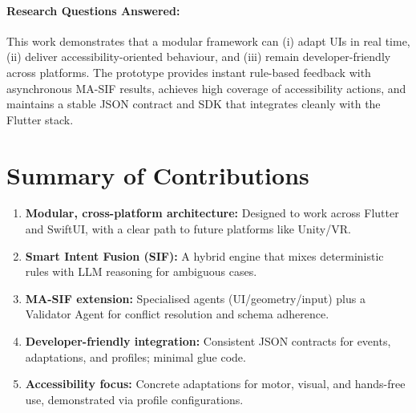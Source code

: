 \documentclass[openany]{book}
\begin{document}
\paragraph{Research Questions Answered:}
This work demonstrates that a modular framework can (i) adapt UIs in real time, (ii) deliver accessibility-oriented behaviour, and (iii) remain developer-friendly across platforms. The prototype provides instant rule-based feedback with asynchronous MA-SIF results, achieves high coverage of accessibility actions, and maintains a stable JSON contract and SDK that integrates cleanly with the Flutter stack.

\section{Summary of Contributions}
\begin{enumerate}
    \item \textbf{Modular, cross-platform architecture:} Designed to work across Flutter and SwiftUI, with a clear path to future platforms like Unity/VR.
    \item \textbf{Smart Intent Fusion (SIF):} A hybrid engine that mixes deterministic rules with LLM reasoning for ambiguous cases.
    \item \textbf{MA-SIF extension:} Specialised agents (UI/geometry/input) plus a Validator Agent for conflict resolution and schema adherence.
    \item \textbf{Developer-friendly integration:} Consistent JSON contracts for events, adaptations, and profiles; minimal glue code.
    \item \textbf{Accessibility focus:} Concrete adaptations for motor, visual, and hands-free use, demonstrated via profile configurations.
\end{enumerate}
\newpage
\end{document}
